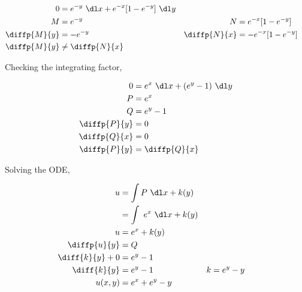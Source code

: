 \begin{enumerate}
          \begin{align}
              0            & = e^{-y}\ \dl x + e^{-x}[1 - e^{-y}]\ \dl y                                        \\
              M            & = e^{-y}                                    & N            & = e^{-x}[1 - e^{-y}]  \\
              \diffp{M}{y} & = -e^{-y}                                   & \diffp{N}{x} & = -e^{-x}[1 - e^{-y}] \\
              \diffp{M}{y} & \neq \diffp{N}{x}
          \end{align}

          Checking the integrating factor,

          \begin{align}
              0            & = e^{x}\ \dl x + (e^{y} - 1)\ \dl y \\
              P            & = e^{x}                             \\
              Q            & = e^{y} - 1                         \\
              \diffp{P}{y} & = 0                                 \\
              \diffp{Q}{x} & = 0                                 \\
              \diffp{P}{y} & = \diffp{Q}{x}
          \end{align}

          Solving the ODE,

          \begin{align}
              u               & = \int P\ \dl x + k(y)                        \\
                              & = \int\ e^{x}\ \dl x + k(y)                   \\
              u               & = e^{x} + k(y)                                \\
              \diffp{u}{y}    & = Q                                           \\
              \diff{k}{y} + 0 & = e^{y} - 1                                   \\
              \diff{k}{y}     & = e^{y} - 1                 & k & = e^{y} - y \\
              u(x, y)         & = e^{x} + e^{y} - y
          \end{align}



\end{enumerate}
